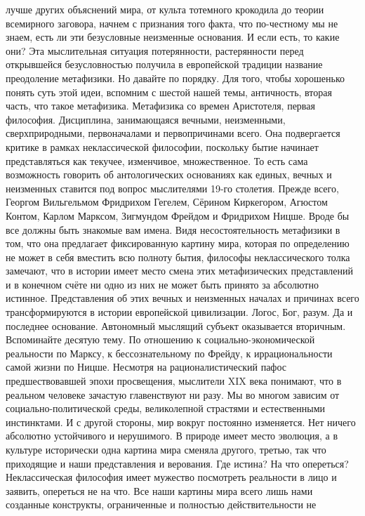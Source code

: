 лучше других объяснений мира, от культа тотемного крокодила до теории всемирного
заговора, начнем с признания того факта, что по-честному мы не знаем, есть ли
эти безусловные неизменные основания. И если есть, то какие они? Эта
мыслительная ситуация потерянности, растерянности перед открывшейся
безусловностью получила в европейской традиции название преодоление метафизики.
Но давайте по порядку. Для того, чтобы хорошенько понять суть этой идеи,
вспомним с шестой нашей темы, античность, вторая часть, что такое метафизика.
Метафизика со времен Аристотеля, первая философия. Дисциплина, занимающаяся
вечными, неизменными, сверхприродными, первоначалами и первопричинами всего. Она
подвергается критике в рамках неклассической философии, поскольку бытие начинает
представляться как текучее, изменчивое, множественное. То есть сама возможность
говорить об антологических основаниях как единых, вечных и неизменных ставится
под вопрос мыслителями 19-го столетия. Прежде всего, Георгом Вильгельмом
Фридрихом Гегелем, Сёрином Киркегором, Агюстом Контом, Карлом Марксом, Зигмундом
Фрейдом и Фридрихом Ницше. Вроде бы все должны быть знакомые вам имена. Видя
несостоятельность метафизики в том, что она предлагает фиксированную картину
мира, которая по определению не может в себя вместить всю полноту бытия,
философы неклассического толка замечают, что в истории имеет место смена этих
метафизических представлений и в конечном счёте ни одно из них не может быть
принято за абсолютно истинное. Представления об этих вечных и неизменных началах
и причинах всего трансформируются в истории европейской цивилизации. Логос, Бог,
разум. Да и последнее основание. Автономный мыслящий субъект оказывается
вторичным. Вспоминайте десятую тему. По отношению к социально-экономической
реальности по Марксу, к бессознательному по Фрейду, к иррациональности самой
жизни по Ницше. Несмотря на рационалистический пафос предшествовавшей эпохи
просвещения, мыслители XIX века понимают, что в реальном человеке зачастую
главенствуют ни разу. Мы во многом зависим от социально-политической среды,
великолепной страстями и естественными инстинктами. И с другой стороны, мир
вокруг постоянно изменяется. Нет ничего абсолютно устойчивого и нерушимого. В
природе имеет место эволюция, а в культуре исторически одна картина мира сменяла
другого, третью, так что приходящие и наши представления и верования. Где
истина? На что опереться? Неклассическая философия имеет мужество посмотреть
реальности в лицо и заявить, опереться не на что. Все наши картины мира всего
лишь нами созданные конструкты, ограниченные и полностью действительности не
